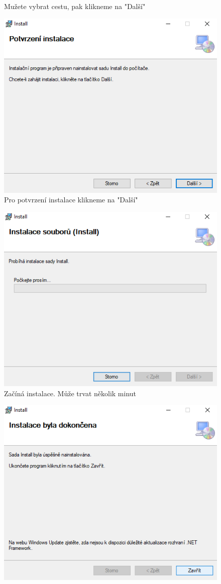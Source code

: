 \documentclass[12pt,a4paper]{article}
\begin{document}
\begin{enumerate}
\begin{figure}[H]
		\caption{Mužete vybrat cestu, pak klikneme na "Další"}
	\end{figure}
	\begin{figure}[H]
		\center\includegraphics[width=0.8\linewidth]{pictures/6}
		\caption{Pro potvrzení instalace klikneme na "Další"}
	\end{figure}
	\begin{figure}[H]
		\center\includegraphics[width=0.8\linewidth]{pictures/7}
		\caption{Začíná instalace. Může trvat několik minut}
	\end{figure}
	\begin{figure}[H]
		\center\includegraphics[width=0.8\linewidth]{pictures/8}

\end{figure}
\end{enumerate}
\end{document}
